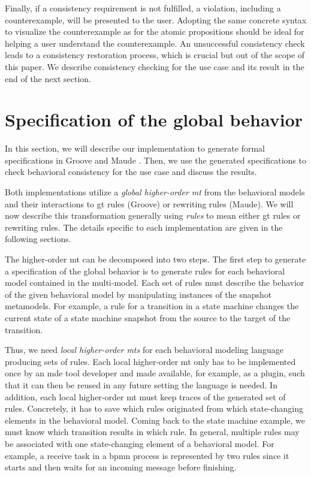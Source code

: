 \documentclass{jot}
\begin{document}
Finally, if a consistency requirement is not fulfilled, a violation, including a counterexample, will be presented to the user.
Adopting the same concrete syntax to visualize the counterexample as for the atomic propositions should be ideal for helping a user understand the counterexample. 
An unsuccessful consistency check leads to a consistency restoration process, which is crucial but out of the scope of this paper.
We describe consistency checking for the use case and its result in the end of the next section.


\section{Specification of the global behavior} \label{sec:specification_of_the_global_behavior}
In this section, we will describe our implementation to generate formal specifications in Groove \cite{rensinkGROOVESimulatorTool2004} and Maude \cite{manuelclavelAllMaudeHighPerformance2007}.
Then, we use the generated specifications to check behavioral consistency for the use case and discuss the results.

Both implementations utilize a \emph{global higher-order \gls*{mt}} from the behavioral models and their interactions to \gls*{gt} rules (Groove) or rewriting rules (Maude).
We will now describe this transformation generally using \emph{rules} to mean either \gls*{gt} rules or rewriting rules.
The details specific to each implementation are given in the following sections.

The higher-order \gls*{mt} can be decomposed into two steps.
The first step to generate a specification of the global behavior is to generate rules for each behavioral model contained in the multi-model.
Each set of rules must describe the behavior of the given behavioral model by manipulating instances of the snapshot metamodels.
For example, a rule for a transition in a state machine changes the current state of a state machine snapshot from the source to the target of the transition. 

Thus, we need \emph{local higher-order \gls*{mt}s} for each behavioral modeling language producing sets of rules.
Each local higher-order \gls*{mt} only has to be implemented once by an \gls*{mde} tool developer and made available, for example, as a plugin, such that it can then be reused in any future setting the language is needed.
In addition, each local higher-order \gls*{mt} must keep traces of the generated set of rules.
Concretely, it has to save which rules originated from which state-changing elements in the behavioral model.
Coming back to the state machine example, we must know which transition results in which rule.
In general, multiple rules may be associated with one state-changing element of a behavioral model.
For example, a receive task in a \gls*{bpmn} process is represented by two rules since it starts and then waits for an incoming message before finishing.
\end{document}
